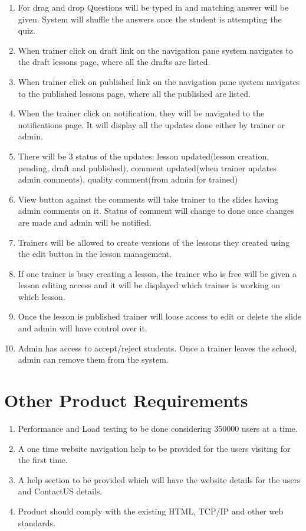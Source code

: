 \documentclass{article}
\begin{document}
\begin{enumerate}
    \item For drag and drop Questions will be typed in and matching answer will be given. System will shuffle the answers once the student is attempting the quiz.
    \item When trainer click on draft link on the navigation pane system navigates to the draft lessons page, where all the drafts are listed.
    \item When trainer click on published link on the navigation pane system navigates to the published lessons page, where all the published are listed.
    \item When the trainer click on notification, they will be navigated to the notifications page. It will display all the updates done either by trainer or admin.
    \item There will be 3 status of the updates: lesson updated(lesson creation, pending, draft and published), comment updated(when trainer updates admin comments), quality comment(from admin for trained)
    \item View button against the comments will take trainer to the slides having admin comments on it. Status of comment will change to done once changes are made and admin will be notified.
    \item Trainers will be allowed to create versions of the lessons they created using the edit button in the lesson management.
    \item If one trainer is busy creating a lesson, the trainer who is free will be given a lesson editing access and it will be displayed which trainer is working on which lesson.
    \item Once the lesson is published trainer will loose access to edit or delete the slide and admin will have control over it.
    \item Admin has access to accept/reject students. Once a trainer leaves the school, admin can remove them from the system.
    
\end{enumerate}

\section{Other Product Requirements}
\begin{enumerate}
    \item Performance and Load testing to be done considering 350000 users at a time.
    \item A one time website navigation help to be provided for the users visiting for the first time.
    \item A help section to be provided which will have the website details for the users and ContactUS details.
    \item Product should comply with the existing HTML, TCP/IP and other web standards. 
\end{enumerate}
\end{document}
